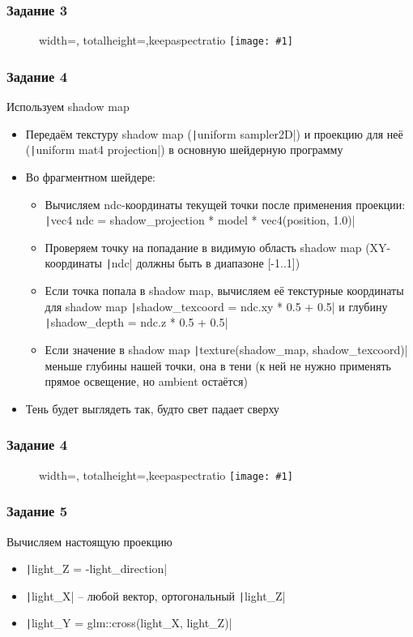 \documentclass[10pt]{beamer}
\newcommand{\slideimage}[1]{
  \begin{figure}
    \begin{adjustbox}{width=\textwidth, totalheight=\textheight-2\baselineskip-2\baselineskip,keepaspectratio}
      \texttt{[image: \#1]}
    \end{adjustbox}
  \end{figure}
}
\begin{document}
\begin{frame}[fragile]
\frametitle{Задание 3}
\slideimage{3.png}
\end{frame}

\begin{frame}[fragile]
\frametitle{Задание 4}
\begin{footnotesize}
Используем shadow map
\begin{itemize}
\item Передаём текстуру shadow map (\texttt|uniform sampler2D|) и проекцию для неё (\texttt|uniform mat4 projection|) в основную шейдерную программу
\item Во фрагментном шейдере:
\begin{itemize}
\item Вычисляем ndc-координаты текущей точки после применения проекции: \texttt|vec4 ndc = shadow_projection * model * vec4(position, 1.0)|
\item Проверяем точку на попадание в видимую область shadow map (XY-координаты \texttt|ndc| должны быть в диапазоне [-1..1])
\item Если точка попала в shadow map, вычисляем её текстурные координаты для shadow map \texttt|shadow_texcoord = ndc.xy * 0.5 + 0.5| и глубину \texttt|shadow_depth = ndc.z * 0.5 + 0.5|
\item Если значение в shadow map \texttt|texture(shadow_map, shadow_texcoord)| меньше глубины нашей точки, она в тени (к ней не нужно применять прямое освещение, но ambient остаётся)
\end{itemize}
\item Тень будет выглядеть так, будто свет падает сверху
\end{itemize}
\end{footnotesize}
\end{frame}

\begin{frame}[fragile]
\frametitle{Задание 4}
\slideimage{4.png}
\end{frame}

\begin{frame}[fragile]
\frametitle{Задание 5}
\fontsize{10pt}{10pt}
Вычисляем настоящую проекцию
\begin{itemize}
\item \texttt|light_Z = -light_direction|
\item \texttt|light_X| -- любой вектор, ортогональный \texttt|light_Z|
\item \texttt|light_Y = glm::cross(light_X, light_Z)|
\end{itemize}
\end{frame}
\end{document}
